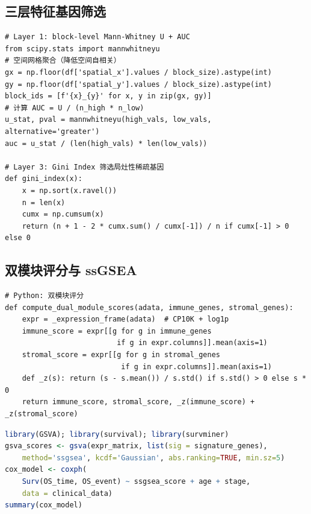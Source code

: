 \documentclass[12pt, a4paper]{ctexart}
\begin{document}
\subsection{三层特征基因筛选}

\begin{lstlisting}[caption={Layer 1 差异检验、Layer 3 Gini Index 计算}]
# Layer 1: block-level Mann-Whitney U + AUC
from scipy.stats import mannwhitneyu
# 空间网格聚合（降低空间自相关）
gx = np.floor(df['spatial_x'].values / block_size).astype(int)
gy = np.floor(df['spatial_y'].values / block_size).astype(int)
block_ids = [f'{x}_{y}' for x, y in zip(gx, gy)]
# 计算 AUC = U / (n_high * n_low)
u_stat, pval = mannwhitneyu(high_vals, low_vals, alternative='greater')
auc = u_stat / (len(high_vals) * len(low_vals))

# Layer 3: Gini Index 筛选局灶性稀疏基因
def gini_index(x):
    x = np.sort(x.ravel())
    n = len(x)
    cumx = np.cumsum(x)
    return (n + 1 - 2 * cumx.sum() / cumx[-1]) / n if cumx[-1] > 0 else 0
\end{lstlisting}

\subsection{双模块评分与 ssGSEA}

\begin{lstlisting}[caption={双模块评分计算（Python）与 ssGSEA 评分（R）}]
# Python: 双模块评分
def compute_dual_module_scores(adata, immune_genes, stromal_genes):
    expr = _expression_frame(adata)  # CP10K + log1p
    immune_score = expr[[g for g in immune_genes
                          if g in expr.columns]].mean(axis=1)
    stromal_score = expr[[g for g in stromal_genes
                           if g in expr.columns]].mean(axis=1)
    def _z(s): return (s - s.mean()) / s.std() if s.std() > 0 else s * 0
    return immune_score, stromal_score, _z(immune_score) + _z(stromal_score)
\end{lstlisting}

\begin{lstlisting}[language=R, caption={ssGSEA + 多变量 Cox 回归（R）}]
library(GSVA); library(survival); library(survminer)
gsva_scores <- gsva(expr_matrix, list(sig = signature_genes),
    method='ssgsea', kcdf='Gaussian', abs.ranking=TRUE, min.sz=5)
cox_model <- coxph(
    Surv(OS_time, OS_event) ~ ssgsea_score + age + stage,
    data = clinical_data)
summary(cox_model)
\end{lstlisting}



\end{document}

